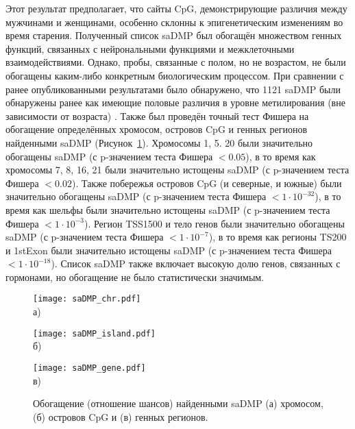 Этот результат предполагает, что сайты CpG, демонстрирующие различия между мужчинами и женщинами, особенно склонны к эпигенетическим изменениям во время старения. Полученный список saDMP был обогащён множеством генных функций, связанных с нейрональными функциями и межклеточными взаимодействиями. Однако, пробы, связанные с полом, но не возрастом, не были обогащены каким-либо конкретным биологическим процессом. При сравнении с ранее опубликованными результатами было обнаружено, что 1121 saDMP были обнаружены ранее как имеющие половые различия в уровне метилирования (вне зависимости от возраста) \autocite{Inoshita2015, Singmann2015, Yousefi2015}. Также был проведён точный тест Фишера \autocite{fisher2006statistical} на обогащение определённых хромосом, островов CpG и генных регионов найденными saDMP (Рисунок~\ref{fig:saDMP_Fisher}). Хромосомы 1, 5. 20 были значительно обогащены saDMP (с p-значением теста Фишера $< 0.05$), в то время как хромосомы 7, 8, 16, 21 были значительно истощены saDMP (с p-значением теста Фишера $< 0.02$). Также побережья островов CpG (и северные, и южные) были значительно обогащены saDMP (с p-значением теста Фишера $< 1 \cdot 10^{-32}$), в то время как шельфы были значительно истощены saDMP (с p-значением теста Фишера $< 1 \cdot 10^{-3}$). Регион TSS1500 и тело генов были значительно обогащены saDMP (с p-значением теста Фишера $< 1 \cdot 10^{-7}$), в то время как регионы TS200 и 1stExon были значительно истощены saDMP (с p-значением теста Фишера $< 1 \cdot 10^{-18}$). Список saDMP также включает высокую долю генов, связанных с гормонами, но обогащение не было статистически значимым.

\begin{figure}[ht]
	\begin{minipage}[b][][b]{0.49\linewidth}\centering
		\texttt{[image: saDMP\_chr.pdf]} \\ а)
	\end{minipage}
	\hfill
	\begin{minipage}[b][][b]{0.49\linewidth}\centering
		\texttt{[image: saDMP\_island.pdf]} \\ б)
	\end{minipage}
	\begin{minipage}[b][][b]{0.99\linewidth}\centering
		\texttt{[image: saDMP\_gene.pdf]} \\ в)
	\end{minipage}
	\caption[Обогащение найденными saDMP хромосом, островов CpG и генных регионов.]{Обогащение (отношение шансов) найденными saDMP (а) хромосом, (б) островов CpG и (в) генных регионов.}
	\label{fig:saDMP_Fisher}
\end{figure}

